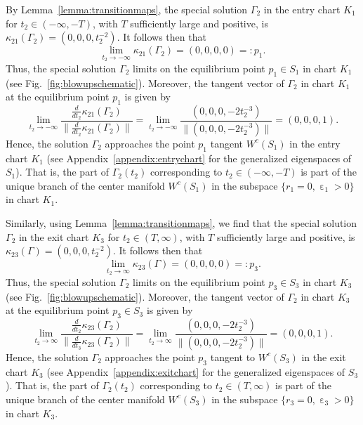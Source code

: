 \documentclass[10pt,onecolumn]{article}
\theoremstyle{plain}
\DeclareMathOperator{\eps}{\varepsilon}
\begin{document}
By Lemma~\ref{lemma:transitionmaps}, the special solution $\Gamma_2$ in the entry chart $K_1$ for $t_2 \in (-\infty,-T)$, with $T$ sufficiently large and positive, is $\kappa_{21} \left( \Gamma_2 \right) = \left( 0,0,0,t_2^{-2} \right)$. It follows then that
%
\[ \lim_{t_2 \to -\infty} \kappa_{21} \left( \Gamma_2 \right) = \left( 0,0,0,0 \right) =: p_1.  \]
%
Thus, the special solution $\Gamma_2$ limits on the equilibrium point $p_1 \in S_1$ in chart $K_1$ (see Fig.~\ref{fig:blowupschematic}). 
Moreover, the tangent vector of $\Gamma_2$ in chart $K_1$ at the equilibrium point $p_1$ is given by
%
\[ \lim_{t_2 \to -\infty} \frac{\tfrac{d}{dt_2} \kappa_{21} \left( \Gamma_2 \right)}{\lVert \tfrac{d}{dt_2} \kappa_{21} \left( \Gamma_2 \right) \rVert} = \lim_{t_2 \to -\infty} \frac{(0,0,0,-2t_2^{-3})}{\lVert (0,0,0,-2t_2^{-3}) \rVert} = (0,0,0,1). \]
%
Hence, the solution $\Gamma_2$ approaches the point $p_1$ tangent $W^c(S_1)$ in the entry chart $K_1$ (see Appendix~\ref{appendix:entrychart} for the generalized eigenspaces of $S_1$). That is, the part of $\Gamma_2(t_2)$ corresponding to $t_2 \in (-\infty,-T)$ is part of the unique branch of the center manifold $W^c(S_1)$ in the subspace $\{ r_1 = 0, \eps_1 >0 \}$ in chart $K_1$.

Similarly, using Lemma~\ref{lemma:transitionmaps}, we find that the special solution $\Gamma_2$ in the exit chart $K_3$ for $t_2 \in (T,\infty)$, with $T$ sufficiently large and positive, is $\kappa_{23} \left( \Gamma \right) = \left( 0,0,0,t_2^{-2} \right)$. It follows then that
%
\[ \lim_{t_2 \to \infty} \kappa_{23} \left( \Gamma \right) = \left( 0,0,0,0 \right) =: p_3.  \]
%
Thus, the special solution $\Gamma_2$ limits on the equilibrium point $p_3 \in S_3$ in chart $K_3$ (see Fig.~\ref{fig:blowupschematic}).
Moreover, the tangent vector of $\Gamma_2$ in chart $K_3$ at the equilibrium point $p_3\in S_3$ is given by
%
\[ \lim_{t_2 \to \infty} \frac{\tfrac{d}{dt_2} \kappa_{23} \left( \Gamma_2 \right)}{\lVert \tfrac{d}{dt_3} \kappa_{23} \left( \Gamma_2 \right) \rVert} = \lim_{t_2 \to \infty} \frac{(0,0,0,-2t_2^{-3})}{\lVert (0,0,0,-2t_2^{-3}) \rVert} = (0,0,0,1). \]
%
Hence, the solution $\Gamma_2$ approaches the point $p_3$ tangent to $W^c(S_3)$ in the exit chart $K_3$ (see Appendix~\ref{appendix:exitchart} for the generalized eigenspaces of $S_3$). That is, the part of $\Gamma_2(t_2)$ corresponding to $t_2 \in (T,\infty)$ is part of the unique branch of the center manifold $W^c(S_3)$ in the subspace $\{ r_3 = 0, \eps_3 >0 \}$ in chart $K_3$. 
\end{document}
